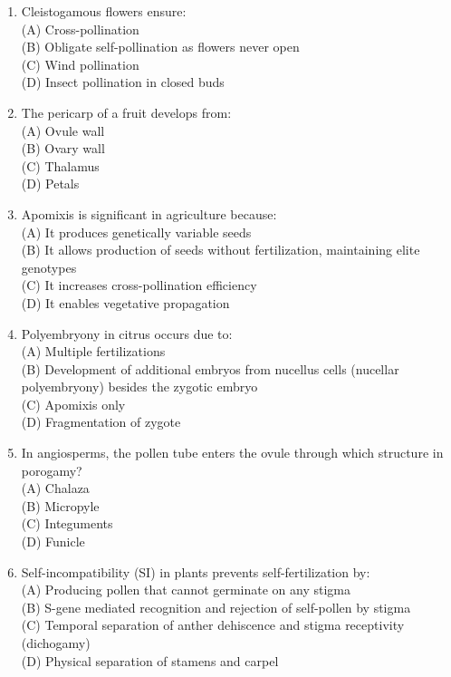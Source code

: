 \documentclass{article}
\begin{document}
\begin{enumerate}[label=Q\arabic*.]
\item Cleistogamous flowers ensure:
\\(A) Cross-pollination
\\(B) Obligate self-pollination as flowers never open
\\(C) Wind pollination
\\(D) Insect pollination in closed buds

\item The pericarp of a fruit develops from:
\\(A) Ovule wall
\\(B) Ovary wall
\\(C) Thalamus
\\(D) Petals

\item Apomixis is significant in agriculture because:
\\(A) It produces genetically variable seeds
\\(B) It allows production of seeds without fertilization, maintaining elite genotypes
\\(C) It increases cross-pollination efficiency
\\(D) It enables vegetative propagation

\item Polyembryony in citrus occurs due to:
\\(A) Multiple fertilizations
\\(B) Development of additional embryos from nucellus cells (nucellar polyembryony) besides the zygotic embryo
\\(C) Apomixis only
\\(D) Fragmentation of zygote

\item In angiosperms, the pollen tube enters the ovule through which structure in porogamy?
\\(A) Chalaza
\\(B) Micropyle
\\(C) Integuments
\\(D) Funicle

\item Self-incompatibility (SI) in plants prevents self-fertilization by:
\\(A) Producing pollen that cannot germinate on any stigma
\\(B) S-gene mediated recognition and rejection of self-pollen by stigma
\\(C) Temporal separation of anther dehiscence and stigma receptivity (dichogamy)
\\(D) Physical separation of stamens and carpel


\end{enumerate}
\end{document}
